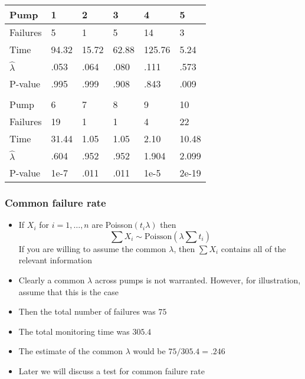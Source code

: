 \documentclass[aspectratio=169]{beamer}
\begin{document}
\begin{frame}
\begin{center}
\ttfamily
\begin{tabular}{llllll} 
Pump           & 1      & 2     & 3     & 4      & 5     \\ \hline
Failures       & 5      & 1     & 5     & 14     & 3     \\ 
Time           & 94.32  & 15.72 & 62.88 & 125.76 & 5.24  \\ 
$\hat \lambda$ & .053   & .064  & .080  & .111   & .573  \\ 
P-value        & .995   & .999  & .908  & .843   & .009  \\ \\ \hline
Pump           & 6      & 7     & 8     & 9      & 10    \\ \hline
Failures       & 19     & 1     & 1     & 4      & 22    \\ 
Time           & 31.44  & 1.05  & 1.05  & 2.10   & 10.48 \\ 
$\hat \lambda$ & .604   & .952  & .952  & 1.904  & 2.099 \\ 
P-value        & 1e-7   & .011  & .011  & 1e-5   & 2e-19 \\ \hline
\end{tabular}
\end{center}
\normalfont  \normalsize
\end{frame}

\begin{frame}\frametitle{Common failure rate}
\begin{itemize}
\item If $X_i$ for $i=1,\ldots,n$ are Poisson$(t_i\lambda)$ then 
  $$
  \sum X_i \sim \mbox{Poisson}\left(\lambda\sum t_i \right)
  $$
  If you are willing to assume the common $\lambda$, then $\sum X_i$ contains
  all of the relevant information
\item Clearly a common $\lambda$ across pumps is not warranted. However, for illustration,
  assume that this is the case
\item Then the total number of failures was $75$
\item The total monitoring time was $305.4$
\item The estimate of the common $\lambda$ would be $75 / 305.4 = .246$
\item Later we will discuss a test for common failure rate
\end{itemize}
\end{frame}
\end{document}
